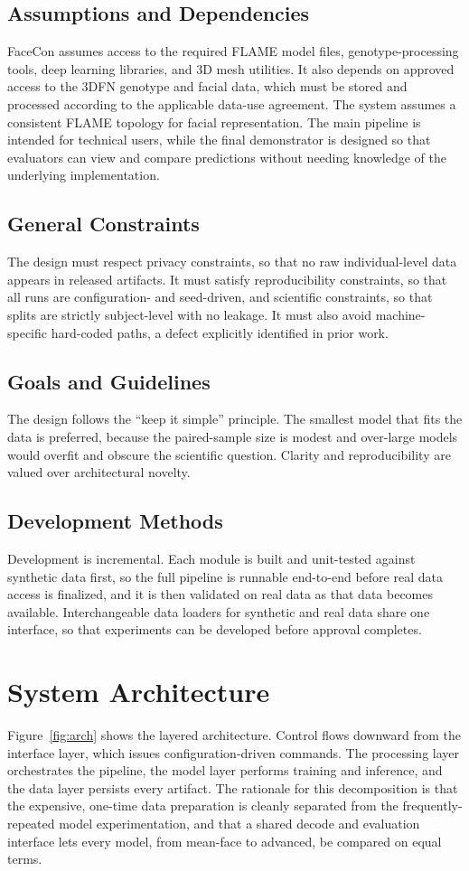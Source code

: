 \subsection{Assumptions and Dependencies}
FaceCon assumes access to the required FLAME model files, genotype-processing tools, deep learning libraries, and 3D mesh utilities. It also depends on approved access to the 3DFN genotype and facial data, which must be stored and processed according to the applicable data-use agreement. The system assumes a consistent FLAME topology for facial representation. The main pipeline is intended for technical users, while the final demonstrator is designed so that evaluators can view and compare predictions without needing knowledge of the underlying implementation.

\subsection{General Constraints}
The design must respect privacy constraints, so that no raw individual-level data appears in released artifacts. It must satisfy reproducibility constraints, so that all runs are configuration- and seed-driven, and scientific constraints, so that splits are strictly subject-level with no leakage. It must also avoid machine-specific hard-coded paths, a defect explicitly identified in prior work.

\subsection{Goals and Guidelines}
The design follows the ``keep it simple'' principle. The smallest model that fits the data is preferred, because the paired-sample size is modest and over-large models would overfit and obscure the scientific question. Clarity and reproducibility are valued over architectural novelty.

\subsection{Development Methods}
Development is incremental. Each module is built and unit-tested against synthetic data first, so the full pipeline is runnable end-to-end before real data access is finalized, and it is then validated on real data as that data becomes available. Interchangeable data loaders for synthetic and real data share one interface, so that experiments can be developed before approval completes.

\section{System Architecture}
Figure~\ref{fig:arch} shows the layered architecture. Control flows downward from the interface layer, which issues configuration-driven commands. The processing layer orchestrates the pipeline, the model layer performs training and inference, and the data layer persists every artifact. The rationale for this decomposition is that the expensive, one-time data preparation is cleanly separated from the frequently-repeated model experimentation, and that a shared decode and evaluation interface lets every model, from mean-face to advanced, be compared on equal terms.

